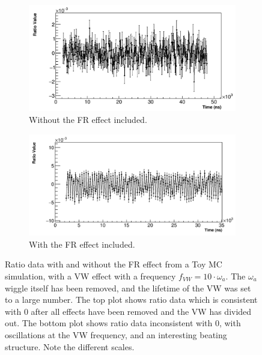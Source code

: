 \documentclass[12pt,letterpaper]{article}
\def\wa{$\omega_{a}$\xspace}
\begin{document}
\begin{figure}[]
\centering
    \begin{subfigure}[t]{0.6\textwidth}
        \centering
        \includegraphics[width=\textwidth]{JamesMC_noFR}
        \caption{Without the FR effect included.}
    \end{subfigure}%

    \begin{subfigure}[t]{0.6\textwidth}
        \centering
        \includegraphics[width=\textwidth]{JamesMC_withFR}
        \caption{With the FR effect included.}
    \end{subfigure}
\caption[]{Ratio data with and without the FR effect from a Toy MC simulation, with a VW effect with a frequency $f_{VW} = 10 \cdot \omega_{a}$. The \wa wiggle itself has been removed, and the lifetime of the VW was set to a large number. The top plot shows ratio data which is consistent with 0 after all effects have been removed and the VW has divided out. The bottom plot shows ratio data inconsistent with 0, with oscillations at the VW frequency, and an interesting beating structure. Note the different scales.}
\label{fig:JamesMC_VW_FR}
\end{figure}
\end{document}
